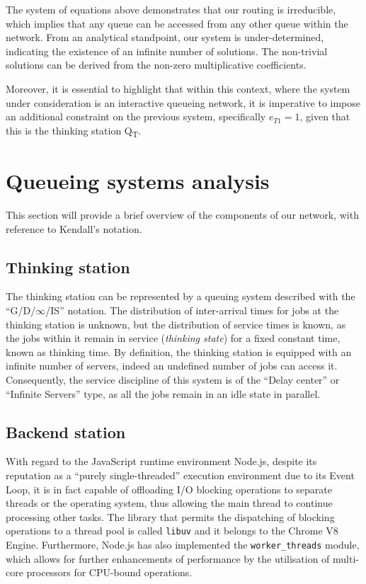 The system of equations above demonstrates that our routing is irreducible, which implies that any queue can be accessed from any other queue within the network.
From an analytical standpoint, our system is under-determined, indicating the existence of an infinite number of solutions. The non-trivial solutions can be derived from the non-zero multiplicative coefficients.

Moreover, it is essential to highlight that within this context, where the system under consideration is an interactive queueing network, it is imperative to impose an additional constraint on the previous system, specifically $e_{T1}=1$, given that this is the thinking station Q\textsubscript{T}.

\section{Queueing systems analysis}

This section will provide a brief overview of the components of our network, with reference to Kendall's notation.

\subsection{Thinking station}

The thinking station can be represented by a queuing system described with the \newline ``G/D/$\infty$/IS'' notation.
The distribution of inter-arrival times for jobs at the thinking station is unknown, but the distribution of service times is known, as the jobs within it remain in service (\textit{thinking state}) for a fixed constant time, known as thinking time.
By definition, the thinking station is equipped with an infinite number of servers, indeed an undefined number of jobs can access it.
Consequently, the service discipline of this system is of the ``Delay center'' or ``Infinite Servers'' type, as all the jobs remain in an idle state in parallel.

\subsection{Backend station}

With regard to the JavaScript runtime environment Node.js, despite its reputation as a ``purely single-threaded'' execution environment due to its Event Loop, it is in fact capable of offloading I/O blocking operations to separate threads or the operating system, thus allowing the main thread to continue processing other tasks.
The library that permits the dispatching of blocking operations to a thread pool is called \verb|libuv| and it belongs to the Chrome V8 Engine.
Furthermore, Node.js has also implemented the \verb|worker_threads| module, which allows for further enhancements of performance by the utilisation of multi-core processors for CPU-bound operations.

